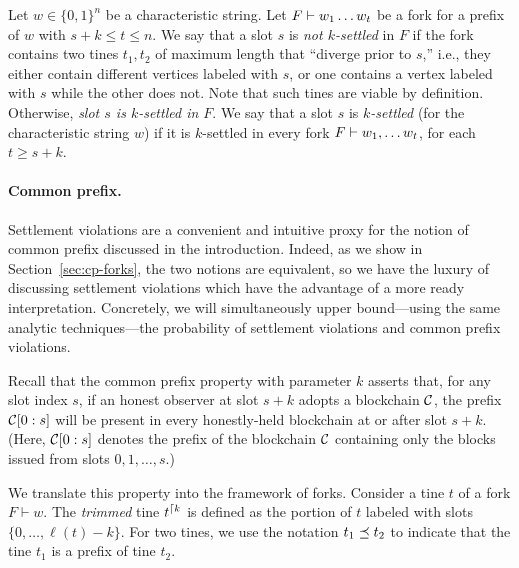 \begin{definition}\label{def:settlement}
  Let $w \in \{0,1\}^n$ be a characteristic string. Let
  $F \vdash w_1 \ldots w_t$ be a fork for a prefix of $w$ with
  $s + k \leq t \leq n$.  We say that a slot $s$ is \emph{not
    $k$-settled} in $F$ if the fork contains two tines $t_1, t_2$ of
  maximum length that ``diverge prior to $s$,'' i.e., they either
  contain different vertices labeled with $s$, or one contains a
  vertex labeled with $s$ while the other does not. Note that such
  tines are viable by definition.
  Otherwise, \emph{slot $s$ is $k$-settled in $F$}. We say that a slot
  $s$ is \emph{$k$-settled} (for the characteristic string $w$) if it
  is $k$-settled in every fork $F \vdash w_1, \ldots w_t$, for each
  $t \geq s+k$.
\end{definition}

\paragraph{Common prefix.} Settlement violations are a convenient and
intuitive proxy for the notion of common prefix discussed in the
introduction. Indeed, as we show in Section~\ref{sec:cp-forks}, the
two notions are equivalent, so we have the luxury of discussing
settlement violations which have the advantage of a more ready
interpretation. Concretely, we will simultaneously upper bound---using
the same analytic techniques---the probability of settlement
violations and common prefix violations.

Recall that the common prefix property with parameter $k$ asserts
that, for any slot index $s$, if an honest observer at slot $s + k$
adopts a blockchain $\mathcal{C}$, the prefix $\mathcal{C}[0 : s]$ will be
present in every honestly-held blockchain at or after slot $s + k$.
(Here, $\mathcal{C}[0 : s]$ denotes the prefix of the blockchain $\mathcal{C}$
containing only the blocks issued from slots $0, 1, \ldots, s$.)

We translate this property into the framework of forks.  Consider a
tine $t$ of a fork $F \vdash w$.  The \emph{trimmed} tine
$t^{\lceil {k}}$ is defined as the portion of $t$ labeled with slots
$\{ 0, \ldots, \ell(t) - k\}$. For two tines, we use the notation
$t_1 \preceq t_2$ to indicate that the tine $t_1$ is a
prefix of tine $t_2$.

